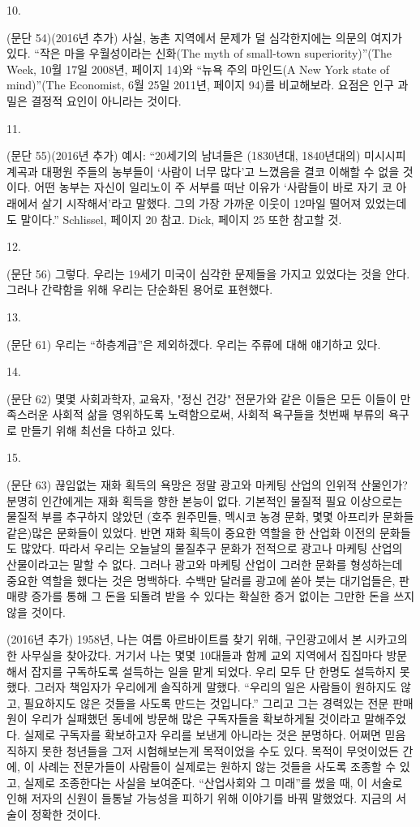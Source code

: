 \documentclass[11pt,a4paper]{article}
\begin{document}
\begin{multicols}{2}
\hypertarget{10}{10.} (문단 54)(2016년 추가) 사실, 농촌 지역에서 문제가 덜 심각한지에는 의문의 여지가 있다. “작은  마을 우월성이라는 신화(The myth of small-town superiority)”(The Week, 10월 17일 2008년,  페이지 14)와 “뉴욕 주의 마인드(A New York state of mind)”(The Economist, 6월 25일 2011년,  페이지 94)를 비교해보라. 요점은 인구 과밀은 결정적 요인이 아니라는 것이다. 


\hypertarget{11}{11.} (문단 55)(2016년 추가) 예시: “20세기의 남녀들은 (1830년대, 1840년대의) 미시시피 계곡과  대평원 주들의 농부들이 ‘사람이 너무 많다’고 느꼈음을 결코 이해할 수 없을 것이다. 어떤 농부는 자신이 일리노이 주 서부를 떠난 이유가 ‘사람들이 바로 자기 코 아래에서 살기 시작해서’라고 말했다. 그의 가장  가까운 이웃이 12마일 떨어져 있었는데도 말이다.” Schlissel, 페이지 20 참고. Dick, 페이지 25 또한  참고할 것. 


\hypertarget{12}{12.} (문단 56) 그렇다. 우리는 19세기 미국이 심각한 문제들을 가지고 있었다는 것을 안다. 그러나  간략함을 위해 우리는 단순화된 용어로 표현했다. 


\hypertarget{13}{13.} (문단 61) 우리는 “하층계급”은 제외하겠다. 우리는 주류에 대해 얘기하고 있다. 


\hypertarget{14}{14.} (문단 62) 몇몇 사회과학자, 교육자, "정신 건강" 전문가와 같은 이들은 모든 이들이 만족스러운  사회적 삶을 영위하도록 노력함으로써, 사회적 욕구들을 첫번째 부류의 욕구로 만들기 위해 최선을  다하고 있다. 


\hypertarget{15}{15.} (문단 63) 끊임없는 재화 획득의 욕망은 정말 광고와 마케팅 산업의 인위적 산물인가? 분명히  인간에게는 재화 획득을 향한 본능이 없다. 기본적인 물질적 필요 이상으로는 물질적 부를 추구하지  않았던 (호주 원주민들, 멕시코 농경 문화, 몇몇 아프리카 문화들 같은)많은 문화들이 있었다. 반면 재화  획득이 중요한 역할을 한 산업화 이전의 문화들도 많았다. 따라서 우리는 오늘날의 물질추구 문화가  전적으로 광고나 마케팅 산업의 산물이라고는 말할 수 없다. 그러나 광고와 마케팅 산업이 그러한 문화를  형성하는데 중요한 역할을 했다는 것은 명백하다. 수백만 달러를 광고에 쏟아 붓는 대기업들은, 판매량 증가를 통해 그 돈을 되돌려 받을 수 있다는 확실한 증거 없이는 그만한 돈을 쓰지 않을 것이다. 


(2016년 추가) 1958년, 나는 여름 아르바이트를 찾기 위해, 구인광고에서 본 시카고의 한 사무실을  찾아갔다. 거기서 나는 몇몇 10대들과 함께 교외 지역에서 집집마다 방문해서 잡지를 구독하도록  설득하는 일을 맡게 되었다. 우리 모두 단 한명도 설득하지 못했다. 그러자 책임자가 우리에게 솔직하게  말했다. “우리의 일은 사람들이 원하지도 않고, 필요하지도 않은 것들을 사도록 만드는 것입니다.” 그리고 
그는 경력있는 전문 판매원이 우리가 실패했던 동네에 방문해 많은 구독자들을 확보하게될 것이라고  말해주었다. 실제로 구독자를 확보하고자 우리를 보낸게 아니라는 것은 분명하다. 어쩌면 믿음직하지  못한 청년들을 그저 시험해보는게 목적이었을 수도 있다. 목적이 무엇이었든 간에, 이 사례는 전문가들이 사람들이 실제로는 원하지 않는 것들을 사도록 조종할 수 있고, 실제로 조종한다는 사실을 보여준다.  “산업사회와 그 미래”를 썼을 때, 이 서술로 인해 저자의 신원이 들통날 가능성을 피하기 위해 이야기를  바꿔 말했었다. 지금의 서술이 정확한 것이다. 



\end{multicols}
\end{document}
